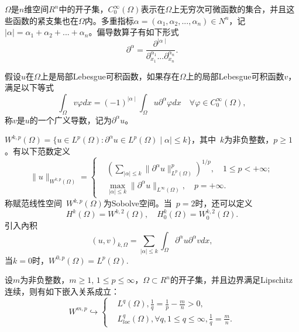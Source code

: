\documentclass[twoside,UTF8]{nputhesis}
\begin{document}
$\Omega$是$n$维空间$R^n$中的开子集，$C^\infty_0(\Omega)$表示在$\Omega$上无穷次可微函数的集合，并且这些函数的紧支集也在$\Omega$内。多重指标$\alpha=(\alpha_1,\alpha_2,...,\alpha_n)\in N^n$，记$\mid \alpha\mid=\alpha_1+\alpha_2+...+\alpha_n$。偏导数算子有如下形式
\begin{equation*}
\partial^\alpha=\frac{\partial^{\mid \alpha\mid}}{\partial^{\alpha_1}_{x_1}...\partial^{\alpha_n}_{x_n}}.
\end{equation*}
\begin{Definition}
{
	假设$u$在$\Omega$上是局部Lebesgue可积函数，如果存在$\Omega$上的局部Lebesgue可积函数$v$，满足以下等式
	\begin{equation*}
	\int_\Omega v\varphi dx=(-1)^{\mid \alpha\mid}\int_\Omega u\partial^\alpha\varphi dx  \quad \forall\varphi\in C^\infty_0(\Omega),
	\end{equation*}
	称$v$是$u$的一个广义导数，记为$\partial^\alpha u$。}
\end{Definition}
\begin{Definition}
	{
		$W^{k,p}(\Omega)=\{u\in L^p(\Omega):\partial^\alpha u\in L^p(\Omega) \mid \alpha\mid\leq k\}$，其中~$k$为非负整数，$p\geq1$。有以下范数定义
		\begin{equation*}
		\| u\|_{W^{k,p}(\Omega)}=\left\{\begin{aligned}&(\sum_{\mid \alpha\mid\leq k}\| \partial^\alpha u\|^p_{L^p(\Omega)})^{1/p},\quad 1\leq p<+\infty;\\&\max_{\mid \alpha\mid\leq k}\| \partial^\alpha u\|_{L^\infty(\Omega)},\quad p=+\infty.\end{aligned}\right.
		\end{equation*}
		称赋范线性空间~$W^{k,p}(\Omega)$为Sobolve空间。当~$p=2$时，还可以定义
		\begin{equation*}
		H^k(\Omega)=W^{k,2}(\Omega),\quad H^k_0(\Omega)=W^{k,2}_0(\Omega).
		\end{equation*}
		引入內积
		\begin{equation*}
		(u,v)_{k,\Omega}=\sum_{\mid \alpha\mid\leq k}\int_\Omega\partial^\alpha u\partial^\alpha vdx,
		\end{equation*}
		当$k=0$时，$W^{0,p}(\Omega)=L^p(\Omega)$.}
\end{Definition}
\begin{Definition}
	{
		设$m$为非负整数，$m\geq1$, $1\leq p\leq\infty$，$\Omega\subset R^n$的开子集，并且边界满足Lipschitz连续，则有如下嵌入关系成立：
		\begin{equation*}
		W^{m,p}\hookrightarrow\left\{\begin{aligned}&L^{q}(\Omega), \frac{1}{q}=\frac{1}{p}-\frac{m}{n}>0,
		\\&L^q_{loc}(\Omega),\forall q,1\leq q\leq\infty, \frac{1}{q}=\frac{m}{n}.\end{aligned}\right.
		\end{equation*}
	}
\end{Definition}
\end{document}
